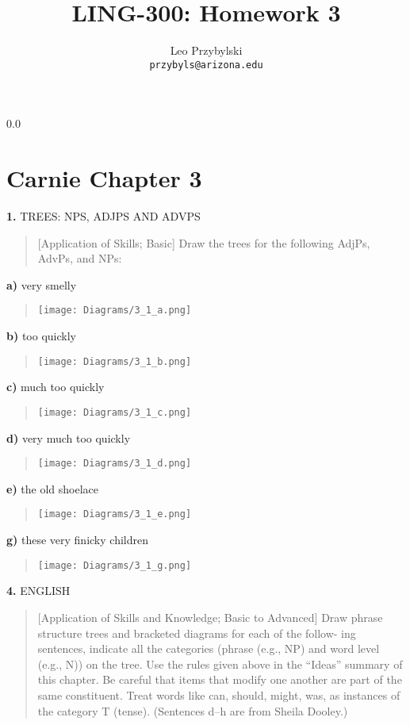 \documentclass[11pt,notitlepage]{article}
\title{LING-300: Homework 3}
\author{Leo Przybylski\\
\texttt{przybyls@arizona.edu}}
\newcommand{\question}[2]{\textbf{#1.} #2}
\newcommand{\subquestion}[2]{\par\hspace{0.5cm} \textbf{#1)} #2}
\begin{document}
  \maketitle
  {\setlength{\baselineskip}%
           {0.0\baselineskip}
  \section*{Carnie Chapter 3}
  \hrulefill \par}
\question{1}{TREES: NPS, ADJPS AND ADVPS}
\begin{quote}
  [Application of Skills; Basic]
  Draw the trees for the following AdjPs, AdvPs, and NPs: 
\end{quote}  

\subquestion{a}{very smelly}

\begin{quote}
\texttt{[image: Diagrams/3\_1\_a.png]}
\end{quote}

\subquestion{b}{too quickly}

\begin{quote}
\texttt{[image: Diagrams/3\_1\_b.png]}
\end{quote}

\subquestion{c}{much too quickly}

\begin{quote}
\texttt{[image: Diagrams/3\_1\_c.png]}
\end{quote}


\subquestion{d}{very much too quickly}

\begin{quote}
\texttt{[image: Diagrams/3\_1\_d.png]}
\end{quote}

\subquestion{e}{the old shoelace}

\begin{quote}
\texttt{[image: Diagrams/3\_1\_e.png]}
\end{quote}

\subquestion{g}{these very finicky children}

\begin{quote}
\texttt{[image: Diagrams/3\_1\_g.png]}
\end{quote}

\question{4}{ENGLISH}
\begin{quote}
[Application of Skills and Knowledge; Basic to Advanced]
Draw phrase structure trees and bracketed diagrams for each of the
follow- ing sentences, indicate all the categories (phrase (e.g., NP)
and word level (e.g., N)) on the tree. Use the rules given above in
the “Ideas” summary of this chapter. Be careful that items that modify
one another are part of the same constituent. Treat words like can,
should, might, was, as instances of the category T (tense). (Sentences
d–h are from Sheila Dooley.)
\end{quote}
\end{document}
